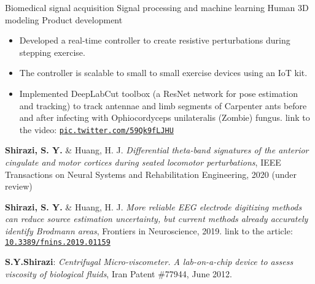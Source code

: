 \begin{outline}
    \1 Biomedical signal acquisition
    \1 Signal processing and machine learning
    \1 Human 3D modeling
    \1 Product development
    
\end{outline}

\begin{itemize}
\item Developed a real-time controller to create resistive perturbations during stepping exercise.
\item The controller is scalable to small to small exercise devices using an IoT kit.
\end{itemize}
\smallskip
{}
\begin{itemize}
\item Implemented DeepLabCut toolbox (a ResNet network for pose estimation and tracking) to track antennae and limb segments of Carpenter ants before and after infecting with Ophiocordyceps unilateralis (Zombie) fungus. {\footnotesize{link to the video:} {\tt{\href{https://pic.twitter.com/59Qk9fLJHU}{pic.twitter.com/59Qk9fLJHU}}}}
\end{itemize}

\smallskip
\textbf{Shirazi, S. Y.} \& Huang, H. J. \textit{Differential theta-band signatures of the anterior cingulate and motor cortices during seated locomotor perturbations}, IEEE Transactions on Neural Systems and Rehabilitation Engineering, 2020 (under review)
\smallskip
\vspace{1ex}

\textbf{Shirazi, S. Y.} \& Huang, H. J. \textit{More reliable EEG electrode digitizing methods can reduce source estimation uncertainty, but current methods already accurately identify Brodmann areas}, Frontiers in Neuroscience, 2019. {\footnotesize{link to the article:} {\tt{\href{https://www.frontiersin.org/articles/10.3389/fnins.2019.01159/}{10.3389/fnins.2019.01159}}}}

\textbf{S.Y.Shirazi}: \textit{Centrifugal Micro-viscometer. A lab-on-a-chip device to assess viscosity of biological fluids}, Iran Patent \#77944, June 2012.
